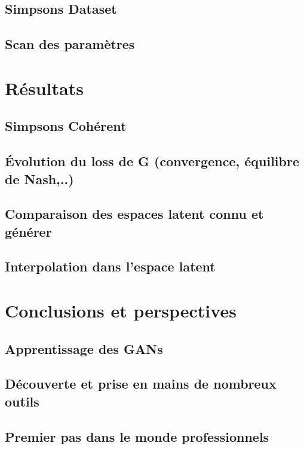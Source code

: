 \documentclass[11pt]{article}
\begin{document}
\subsection{Simpsons Dataset}
\subsection{Scan des paramètres}

\section{Résultats}

\subsection{Simpsons Cohérent}
\subsection{Évolution du loss de G (convergence, équilibre de Nash,..)}
\subsection{Comparaison des espaces latent connu et générer}
\subsection{Interpolation dans l'espace latent}

\section{Conclusions et perspectives}

\subsection{Apprentissage des GANs}
\subsection{Découverte et prise en mains de nombreux outils}
\subsection{Premier pas dans le monde professionnels}

\newpage
\end{document}

